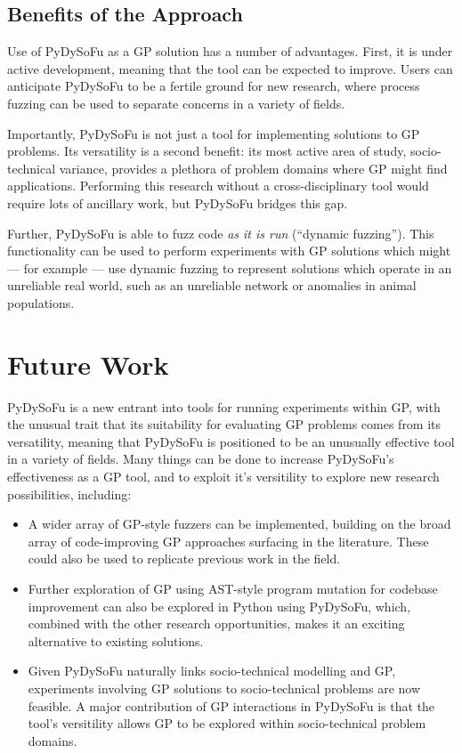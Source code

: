 \documentclass[12pt]{llncs} %
\begin{document}
\subsection{Benefits of the Approach}
Use of PyDySoFu as a GP solution has a number of advantages. First, it is under
active development, meaning that the tool can be expected to improve. Users can
anticipate PyDySoFu to be a fertile ground for new research, where process
fuzzing can be used to separate concerns in a variety of fields.\par

Importantly, PyDySoFu is not just a tool for implementing solutions to GP
problems. Its versatility is a second benefit: its most active area of study,
socio-technical variance, provides a plethora of problem domains where GP might
find applications. Performing this research without a cross-disciplinary tool
would require lots of ancillary work, but PyDySoFu bridges this gap.\par

Further, PyDySoFu is able to fuzz code \emph{as it is run} (``dynamic
fuzzing''). This functionality can be used to perform experiments with GP
solutions which might --- for example --- use dynamic fuzzing to represent
solutions which operate in an unreliable real world, such as an unreliable
network or anomalies in animal populations.\par


\section{Future Work}
\label{sec:future_work}
PyDySoFu is a new entrant into tools for running experiments within GP, with the
unusual trait that its suitability for evaluating GP problems comes from its
versatility, meaning that PyDySoFu is positioned to be an unusually effective
tool in a variety of fields. Many things can be done to increase PyDySoFu's
effectiveness as a GP tool, and to exploit it's versitility to explore new
research possibilities, including:

\begin{itemize}

\item A wider array of GP-style fuzzers can be implemented, building on the
  broad array of code-improving GP approaches surfacing in the literature.
  These could also be used to replicate previous work in the field.
  
\item Further exploration of GP using AST-style program mutation for codebase
  improvement can also be explored in Python using PyDySoFu, which, combined
  with the other research opportunities, makes it an exciting alternative to
  existing solutions.

\item Given PyDySoFu naturally links socio-technical modelling and GP,
  experiments involving GP solutions to socio-technical problems are now
  feasible. A major contribution of GP interactions in PyDySoFu is that the
  tool's versitility allows GP to be explored within socio-technical problem
  domains\cite{wallis2018a}.

\end{itemize}
\end{document}

